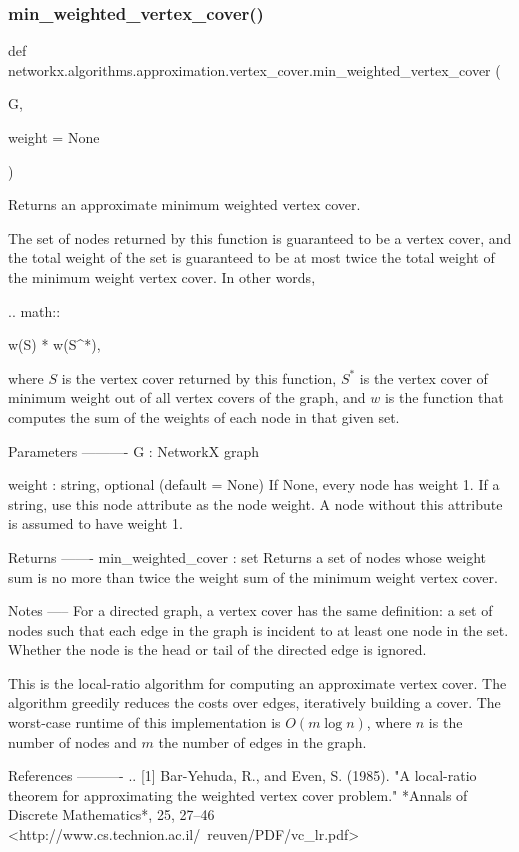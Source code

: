 \subsubsection{\texorpdfstring{min\+\_\+weighted\+\_\+vertex\+\_\+cover()}{min\_weighted\_vertex\_cover()}}
{\footnotesize\ttfamily def networkx.\+algorithms.\+approximation.\+vertex\+\_\+cover.\+min\+\_\+weighted\+\_\+vertex\+\_\+cover (\begin{DoxyParamCaption}\item[{}]{G,  }\item[{}]{weight = {\ttfamily None} }\end{DoxyParamCaption})}

\begin{DoxyVerb}Returns an approximate minimum weighted vertex cover.

The set of nodes returned by this function is guaranteed to be a
vertex cover, and the total weight of the set is guaranteed to be at
most twice the total weight of the minimum weight vertex cover. In
other words,

.. math::

   w(S)  * w(S^*),

where $S$ is the vertex cover returned by this function,
$S^*$ is the vertex cover of minimum weight out of all vertex
covers of the graph, and $w$ is the function that computes the
sum of the weights of each node in that given set.

Parameters
----------
G : NetworkX graph

weight : string, optional (default = None)
    If None, every node has weight 1. If a string, use this node
    attribute as the node weight. A node without this attribute is
    assumed to have weight 1.

Returns
-------
min_weighted_cover : set
    Returns a set of nodes whose weight sum is no more than twice
    the weight sum of the minimum weight vertex cover.

Notes
-----
For a directed graph, a vertex cover has the same definition: a set
of nodes such that each edge in the graph is incident to at least
one node in the set. Whether the node is the head or tail of the
directed edge is ignored.

This is the local-ratio algorithm for computing an approximate
vertex cover. The algorithm greedily reduces the costs over edges,
iteratively building a cover. The worst-case runtime of this
implementation is $O(m \log n)$, where $n$ is the number
of nodes and $m$ the number of edges in the graph.

References
----------
.. [1] Bar-Yehuda, R., and Even, S. (1985). "A local-ratio theorem for
   approximating the weighted vertex cover problem."
   *Annals of Discrete Mathematics*, 25, 27–46
   <http://www.cs.technion.ac.il/~reuven/PDF/vc_lr.pdf>\end{DoxyVerb}
 